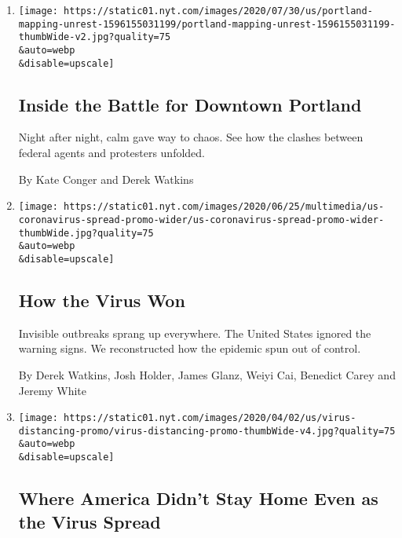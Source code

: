 \begin{enumerate}
\def\labelenumi{\arabic{enumi}.}
\item
  \href{/interactive/2020/07/31/us/portland-protests-map-photos.html}{}

  \texttt{[image: https://static01.nyt.com/images/2020/07/30/us/portland-mapping-unrest-1596155031199/portland-mapping-unrest-1596155031199-thumbWide-v2.jpg?quality=75\\\&auto=webp\\\&disable=upscale]}

  \hypertarget{inside-the-battle-for-downtown-portland}{%
  \subsection{Inside the Battle for Downtown
  Portland}\label{inside-the-battle-for-downtown-portland}}

  Night after night, calm gave way to chaos. See how the clashes between
  federal agents and protesters unfolded.

  By Kate Conger and Derek Watkins
\item
  \href{/interactive/2020/us/coronavirus-spread.html}{}

  \texttt{[image: https://static01.nyt.com/images/2020/06/25/multimedia/us-coronavirus-spread-promo-wider/us-coronavirus-spread-promo-wider-thumbWide.jpg?quality=75\\\&auto=webp\\\&disable=upscale]}

  \hypertarget{how-the-virus-won}{%
  \subsection{How the Virus Won}\label{how-the-virus-won}}

  Invisible outbreaks sprang up everywhere. The United States ignored
  the warning signs. We reconstructed how the epidemic spun out of
  control.

  By Derek Watkins, Josh Holder, James Glanz, Weiyi Cai, Benedict Carey
  and Jeremy White
\item
  \href{/interactive/2020/04/02/us/coronavirus-social-distancing.html}{}

  \texttt{[image: https://static01.nyt.com/images/2020/04/02/us/virus-distancing-promo/virus-distancing-promo-thumbWide-v4.jpg?quality=75\\\&auto=webp\\\&disable=upscale]}

  \hypertarget{where-america-didnt-stay-home-even-as-the-virus-spread}{%
  \subsection{Where America Didn't Stay Home Even as the Virus
  Spread}\label{where-america-didnt-stay-home-even-as-the-virus-spread}}


\end{enumerate}

